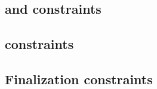 \subsection{\ct{} and \maxCt{} constraints}                                                              \label{rlp auth: generalities: ct and ct_max}                              
\subsection{\rlpAuthUtilsColumnSizeCountdown{} constraints}                                              \label{rlp auth: generalities: byte size countdown constraints}            
\subsection{Finalization constraints}                                                                    \label{rlp auth: generalities: finalization}                               
